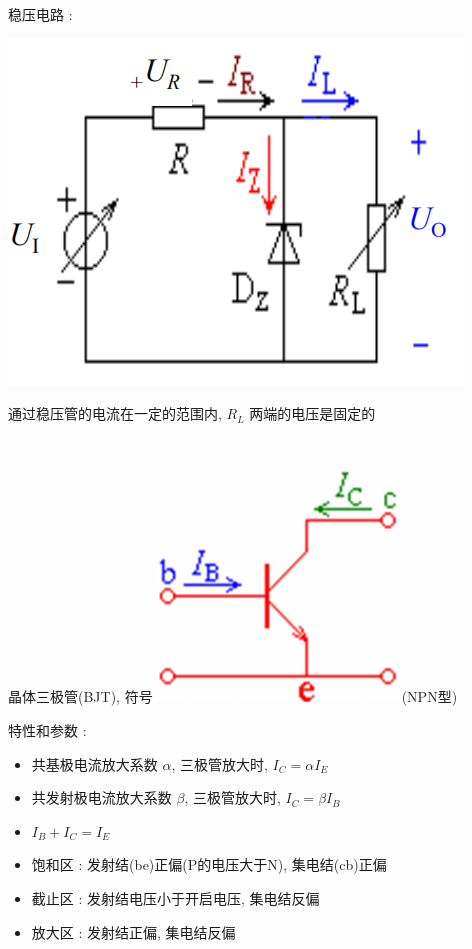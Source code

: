 \documentclass[UTF8, 12pt]{ctexart}
\begin{document}
	稳压电路 : 

	\includegraphics[scale = 0.2]{01/稳压二极管稳压电路.png}

	通过稳压管的电流在一定的范围内, $ R_{L} $ 两端的电压是固定的

	~

	\noindent
	晶体三极管(BJT), 符号\includegraphics[scale = 0.2]{01/晶体三极管符号.png}(NPN型)

	特性和参数 :
	\begin{itemize}[leftmargin = 4em]
		\item 共基极电流放大系数 $ \alpha $, 三极管放大时, $ I_{C} = \alpha I_{E} $
		\item 共发射极电流放大系数 $ \beta $, 三极管放大时, $ I_{C} = \beta I_{B} $
		\item $ I_{B} + I_{C} = I_{E} $
		\item 饱和区 : 发射结(be)正偏(P的电压大于N), 集电结(cb)正偏
		\item 截止区 : 发射结电压小于开启电压, 集电结反偏
		\item 放大区 : 发射结正偏, 集电结反偏
	\end{itemize}
\end{document}
